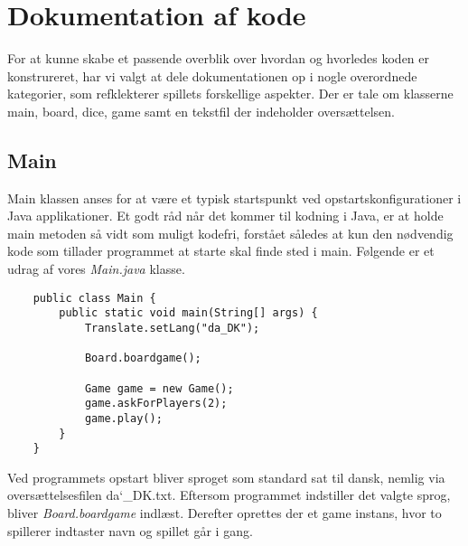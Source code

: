 \chapter{Dokumentation af kode}

\noindent For at kunne skabe et passende overblik over hvordan og hvorledes koden er konstrureret, har vi valgt at dele dokumentationen op i nogle overordnede kategorier, som refklekterer spillets forskellige aspekter. Der er tale om klasserne main, board, dice, game samt en tekstfil der indeholder oversættelsen.\\

\section{Main}
\noindent Main klassen anses for at være et typisk startspunkt ved opstartskonfigurationer i Java applikationer. 
Et godt råd når det kommer til kodning i Java, er at holde main metoden så vidt som muligt kodefri, forstået således at kun den nødvendig kode som tillader programmet at starte skal finde sted i main. 
Følgende er et udrag af vores \textit{Main.java} klasse.\\

\begin{lstlisting}
    public class Main {
        public static void main(String[] args) {
            Translate.setLang("da_DK");
    
            Board.boardgame();
    
            Game game = new Game();
            game.askForPlayers(2);
            game.play();
        }
    }    
\end{lstlisting}
\vspace{2ex}

\noindent Ved programmets opstart bliver sproget som standard sat til dansk, nemlig via oversættelsesfilen da\char`_DK.txt. 
Eftersom programmet indstiller det valgte sprog, bliver \textit{Board.boardgame} indlæst. 
Derefter oprettes der et game instans, hvor to spillerer indtaster navn og spillet går i gang.\\

